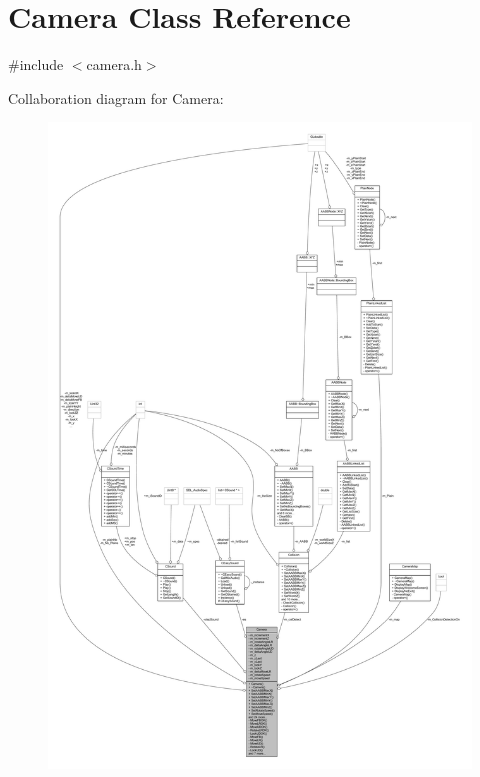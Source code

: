 \hypertarget{class_camera}{}\section{Camera Class Reference}
\label{class_camera}


{\ttfamily \#include $<$camera.\+h$>$}



Collaboration diagram for Camera\+:
\nopagebreak
\begin{figure}[H]
\begin{center}
\leavevmode
\includegraphics[width=350pt]{class_camera__coll__graph}
\end{center}
\end{figure}
